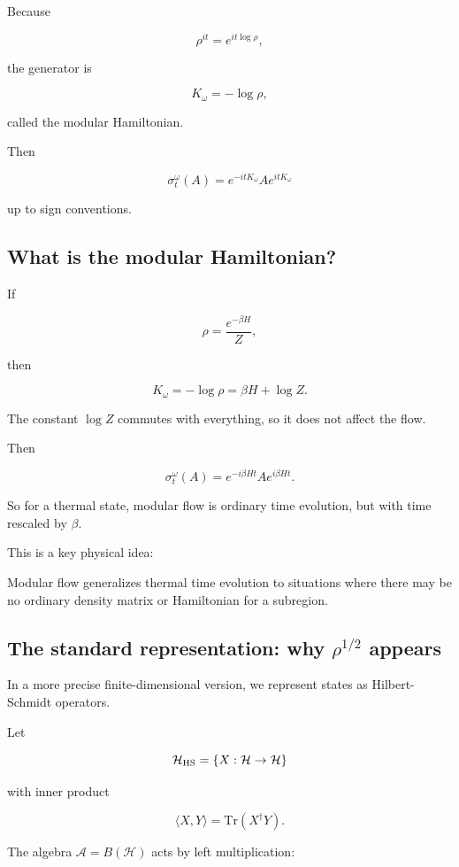\documentclass[11pt,a4paper]{article}
\newenvironment{qiqtquote}{\begin{mdframed}[style=quotestyle]}{\end{mdframed}}
\begin{document}
Because

\[
\rho^{it}=e^{it\log\rho},
\]

the generator is

\[
K_\omega=-\log\rho,
\]

called the modular Hamiltonian.

Then

\[
\sigma_t^\omega(A)
=
e^{-itK_\omega}A e^{itK_\omega}
\]

up to sign conventions.

\subsection{What is the modular Hamiltonian?}

If

\[
\rho=\frac{e^{-\beta H}}{Z},
\]

then

\[
K_\omega=-\log\rho
=
\beta H+\log Z.
\]

The constant $\log Z$ commutes with everything, so it does not affect the flow.

Then

\[
\sigma_t^\omega(A)
=
e^{-i\beta H t} A e^{i\beta H t}.
\]

So for a thermal state, modular flow is ordinary time evolution, but with time rescaled by $\beta$.

This is a key physical idea:

\begin{qiqtquote}
Modular flow generalizes thermal time evolution to situations where there may be no ordinary density matrix or Hamiltonian for a subregion.
\end{qiqtquote}

\subsection{The standard representation: why $\rho^{1/2}$ appears}

In a more precise finite-dimensional version, we represent states as Hilbert-Schmidt operators.

Let

\[
\mathcal{H}_{\rm HS}
=
\{X:\mathcal{H}\to\mathcal{H}\}
\]

with inner product

\[
\langle X,Y\rangle=\mathrm{Tr}(X^\dagger Y).
\]

The algebra $\mathcal{A}=B(\mathcal{H})$ acts by left multiplication:
\end{document}
